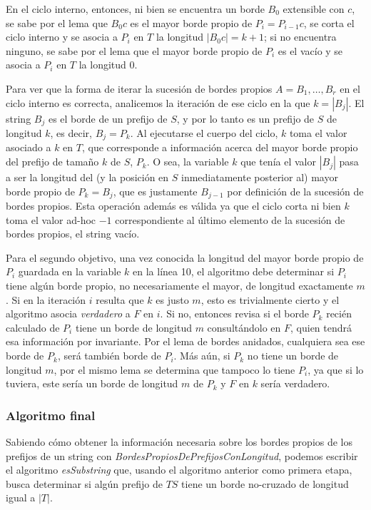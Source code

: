 En el ciclo interno, entonces, ni bien se encuentra un borde $B_0$ extensible con $c$, se sabe por el lema que $B_{0}c$ es el mayor borde propio de $P_i = P_{i-1}c$, se corta el ciclo interno y se asocia a $P_i$ en $T$ la longitud $|B_{0}c| = k+1$; si no encuentra ninguno, se sabe por el lema que el mayor borde propio de $P_i$ es el vacío y se asocia a $P_i$ en $T$ la longitud 0.

Para ver que la forma de iterar la sucesión de bordes propios $A = B_1, \dots, B_r$ en el ciclo interno es correcta, analicemos la iteración de ese ciclo en la que $k = |B_j|$. El string $B_j$ es el borde de un prefijo de $S$, y por lo tanto es un prefijo de $S$ de longitud $k$, es decir, $B_j = P_k$. Al ejecutarse el cuerpo del ciclo, $k$ toma el valor asociado a $k$ en $T$, que corresponde a información acerca del mayor borde propio del prefijo de tamaño $k$ de $S$, $P_k$. O sea, la variable $k$ que tenía el valor $|B_j|$ pasa a ser la longitud del (y la posición en $S$ inmediatamente posterior al) mayor borde propio de $P_k = B_j$, que es justamente $B_{j-1}$ por definición de la sucesión de bordes propios. Esta operación además es válida ya que el ciclo corta ni bien $k$ toma el valor ad-hoc $-1$ correspondiente al último elemento de la sucesión de  bordes propios, el string vacío.

\medskip

Para el segundo objetivo, una vez conocida la longitud del mayor borde propio de $P_i$ guardada en la variable $k$ en la línea 10, el algoritmo debe determinar si $P_i$ tiene algún borde propio, no necesariamente el mayor, de longitud exactamente $m$. Si en la iteración $i$ resulta que $k$ es justo $m$, esto es trivialmente cierto y el algoritmo asocia \textit{verdadero} a $F$ en $i$. Si no, entonces revisa si el borde $P_k$ recién calculado de $P_i$ tiene un borde de longitud $m$ consultándolo en $F$, quien tendrá esa información por invariante. Por el lema de bordes anidados, cualquiera sea ese borde de $P_k$, será también borde de $P_i$. Más aún, si $P_k$ no tiene un borde de longitud $m$, por el mismo lema se determina que tampoco lo tiene $P_i$, ya que si lo tuviera, este sería un borde de longitud $m$ de $P_k$ y $F$ en $k$ sería verdadero.
 
\subsubsection{Algoritmo final}

Sabiendo cómo obtener la información necesaria sobre los bordes propios de los prefijos de un string con \textit{BordesPropiosDePrefijosConLongitud}, podemos escribir el algoritmo \textit{esSubstring} que, usando el algoritmo anterior como primera etapa, busca determinar si algún prefijo de $TS$ tiene un borde no-cruzado de longitud igual a $|T|$.

